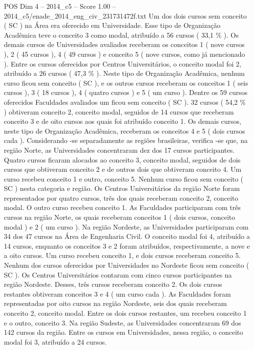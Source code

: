 \begin{textsample}{POS Dim 4 – 2014\_c5 – Score 1.00 – 2014\_c5/enade\_2014\_eng\_civ\_231731472f.txt}
Um dos dois cursos sem conceito ( SC ) na Área era oferecido em Universidade.
Esse tipo de Organização Acadêmica teve o conceito 3 como modal, atribuído a 56 cursos ( 33,1 \% ).
Os demais cursos de Universidades avaliados receberam os conceitos 1 ( nove cursos ), 2 ( 45 cursos ), 4 ( 49 cursos ) e conceito 5 ( nove cursos, como já mencionado ).
Entre os cursos oferecidos por Centros Universitários, o conceito modal foi 2, atribuído a 26 cursos ( 47,3 \% ).
Neste tipo de Organização Acadêmica, nenhum curso ficou sem conceito ( SC ), e os outros cursos receberam os conceitos 1 ( seis cursos ), 3 ( 18 cursos ), 4 ( quatro cursos ) e 5 ( um curso ).
Dentre os 59 cursos oferecidos Faculdades avaliados um ficou sem conceito ( SC ). 32 cursos ( 54,2 \% ) obtiveram conceito 2, conceito modal, seguidos de 14 cursos que receberam conceito 3 e de oito cursos aos quais foi atribuído conceito 1.
Os demais cursos, neste tipo de Organização Acadêmica, receberam os conceitos 4 e 5 ( dois cursos cada ).
Considerando -se separadamente as regiões brasileiras, verifica -se que, na região Norte, as Universidades concentraram dez dos 17 cursos participantes.
Quatro cursos ficaram alocados ao conceito 3, conceito modal, seguidos de dois cursos que obtiveram conceito 2 e de outros dois que obtiveram conceito 4.
Um curso recebeu conceito 1 e outro, conceito 5.
Nenhum curso ficou sem conceito ( SC ) nesta categoria e região.
Os Centros Universitários da região Norte foram representados por quatro cursos, três dos quais receberam conceito 2, conceito modal.
O outro curso recebeu conceito 1.
As Faculdades participaram com três cursos na região Norte, os quais receberam conceitos 1 ( dois cursos, conceito modal ) e 2 ( um curso ).
Na região Nordeste, as Universidades participaram com 34 dos 47 cursos na Área de Engenharia Civil.
O conceito modal foi 4, atribuído a 14 cursos, enquanto os conceitos 3 e 2 foram atribuídos, respectivamente, a nove e a oito cursos.
Um curso recebeu conceito 1, e dois cursos receberam conceito 5.
Nenhum dos cursos oferecidos por Universidades no Nordeste ficou sem conceito ( SC ).
Os Centros Universitários contaram com cinco cursos participantes na região Nordeste.
Desses, três cursos receberam conceito 2.
Os dois cursos restantes obtiveram conceitos 3 e 4 ( um curso cada ).
As Faculdades foram representadas por oito cursos na região Nordeste, seis dos quais receberam conceito 2, conceito modal.
Entre os dois cursos restantes, um recebeu conceito 1 e o outro, conceito 3.
Na região Sudeste, as Universidades concentraram 69 dos 142 cursos da região.
Entre os cursos em Universidades, nessa região, o conceito modal foi 3, atribuído a 24 cursos.

\end{textsample}

